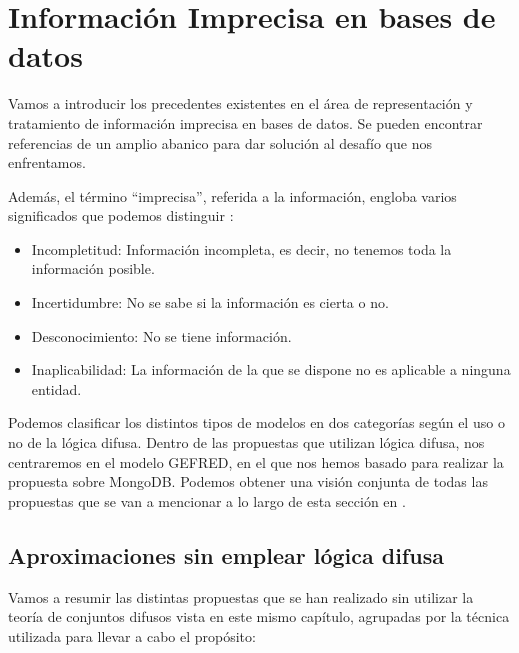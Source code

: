 \section{Información Imprecisa en bases de datos}

Vamos a introducir los precedentes existentes en el área de representación y tratamiento de información imprecisa en bases de datos. Se pueden encontrar referencias de un amplio abanico para dar solución al desafío que nos enfrentamos.

Además, el término ``imprecisa'', referida a la información, engloba varios significados que podemos distinguir \cite{fuzzynotion}:

\begin{itemize}
    \item Incompletitud: Información incompleta, es decir, no tenemos toda la información posible.
    \item Incertidumbre: No se sabe si la información es cierta o no.
    \item Desconocimiento: No se tiene información.
    \item Inaplicabilidad: La información de la que se dispone no es aplicable a ninguna entidad.
\end{itemize}

Podemos clasificar los distintos tipos de modelos en dos categorías según el uso o no de la lógica difusa. Dentro de las propuestas que utilizan lógica difusa, nos centraremos en el modelo GEFRED, en el que nos hemos basado para realizar la propuesta sobre MongoDB. Podemos obtener una visión conjunta de todas las propuestas que se van a mencionar a lo largo de esta sección en \cite{tesismedina, tesisbarranco, tesispepe}.

\subsection{Aproximaciones sin emplear lógica difusa}

Vamos a resumir las distintas propuestas que se han realizado sin utilizar la teoría de conjuntos difusos vista en este mismo capítulo, agrupadas por la técnica utilizada para llevar a cabo el propósito:


